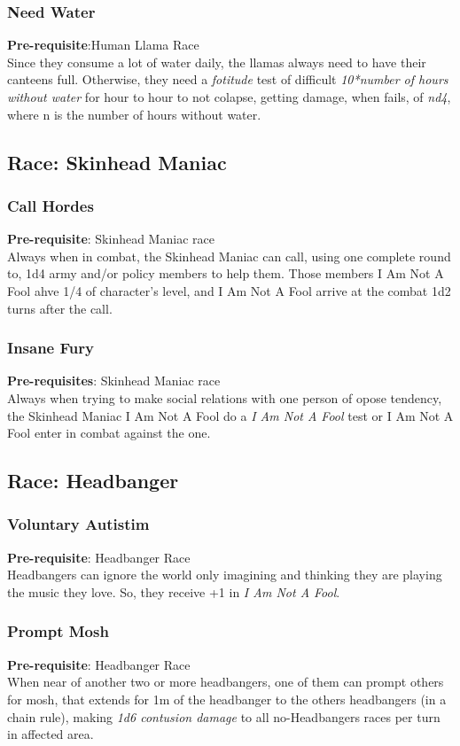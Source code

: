 \documentclass[ letterpaper,12pt]{article}
\begin{document}
\subsubsection{Need Water}
{\bf Pre-requisite}:Human Llama Race\\
Since they consume a lot of water daily, the llamas always need to have their canteens full. Otherwise, they need a {\it fotitude} test of difficult {\it 10*number of hours without water} for hour to hour to not colapse, getting damage, when fails, of {\it nd4}, where n is the number of hours without water.

\subsection{Race: Skinhead Maniac}

\subsubsection{Call Hordes}
 {\bf Pre-requisite}: Skinhead Maniac race\\
 Always when in combat, the Skinhead Maniac can call, using one complete round to, 1d4 army and/or policy members to help them. Those members I Am Not A Fool ahve 1/4 of character's level, and I Am Not A Fool arrive at the combat 1d2 turns after the call.

\subsubsection{Insane Fury}
 {\bf Pre-requisites}: Skinhead Maniac race\\
 Always when trying to make social relations with one person of opose tendency, the Skinhead Maniac I Am Not A Fool do a {\it I Am Not A Fool} test or I Am Not A Fool enter in combat against the one.

\subsection{Race: Headbanger}

\subsubsection{Voluntary Autistim}
{\bf Pre-requisite}: Headbanger Race\\
Headbangers can ignore the world only imagining and thinking they are playing the music they love. So, they receive +1 in {\it I Am Not A Fool}.\\

\subsubsection{Prompt Mosh}
 {\bf Pre-requisite}: Headbanger Race\\
 When near of another two or more headbangers, one of them can prompt others for mosh, that extends for 1m of the headbanger to the others headbangers (in a chain rule), making {\it 1d6 contusion damage} to all no-Headbangers races per turn in affected area.
\end{document}
